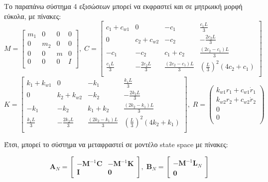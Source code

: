 \documentclass{article}
\begin{document}
Το παραπάνω σύστημα 4 εξισώσεων μπορεί να εκφραστεί και σε μητρωική μορφή εύκολα, με πίνακες:
$$
        M = \begin{bmatrix}
            m_1 & 0 & 0 & 0 \\
            
            0 & m_2 & 0 & 0 \\
            
            0 & 0 & m & 0 \\
            
            0 & 0 & 0 & I \\
        \end{bmatrix},\; C = \begin{bmatrix}
            c_1 + c_{w1} & 0 & -c_1 & \frac{c_1 L}{3} \\
            0 & c_2 + c_{w2} & -c_2 & -\frac{2 c_2 L}{3} \\
            -c_1 & -c_2 & c_1 + c_2 & \frac{(2 c_2 - c_1) L}{3} \\
            \frac{c_1 L}{3} & -\frac{2 c_2 L}{3} & \frac{(2 c_2 - c_1) L}{3} & \left( \frac{L}{3} \right)^2 (4 c_2 + c_1) \\        
        \end{bmatrix} 
$$
$$K = \begin{bmatrix}
            k_1 + k_{w1} & 0 & -k_1 & \frac{k_1 L}{3} \\
            0 & k_2 + k_{w2} & -k_2 & -\frac{2 k_2 L}{3} \\
            -k_1 & -k_2 & k_1 + k_2 & \frac{(2 k_2 - k_1) L}{3} \\
            \frac{k_1 L}{3} & -\frac{2 k_2 L}{3} & \frac{(2 k_2 - k_1) L}{3} & \left( \frac{L}{3} \right)^2 (4 k_2 + k_1) \\
\end{bmatrix},\; R = \begin{pmatrix}
    k_{w1}r_1 + c_{w1}\dot{r}_1\\
    k_{w2}r_2 + c_{w2}\dot{r}_2\\
    0\\
    0\\
\end{pmatrix}$$

Έτσι, μπορεί το σύστημα να μεταφραστεί σε μοντέλο state space με πίνακες:

$$
\mathbf{A}_N = 
\begin{bmatrix}
-\mathbf{M}^{-1} \mathbf{C} & -\mathbf{M}^{-1} \mathbf{K} \\
\mathbf{I} & \mathbf{0}
\end{bmatrix},\; \mathbf{B}_N = 
\begin{bmatrix}
-\mathbf{M}^{-1} \mathbf{L}_N \\
\mathbf{0}
\end{bmatrix}
$$
\end{document}
